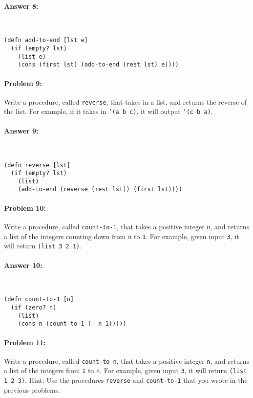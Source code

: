 \documentclass[12pt, letterpaper]{article}
\begin{document}
\paragraph{Answer 8:}~\begin{lstlisting}
(defn add-to-end [lst e]
  (if (empty? lst)
    (list e)
    (cons (first lst) (add-to-end (rest lst) e))))
\end{lstlisting}

\hrulefill
\paragraph{Problem 9:}
  Write a procedure, called \texttt{reverse}, that takes in a list, and returns
  the reverse of the list. For example, if it takes in \texttt{'(a b c)}, it
  will output \texttt{'(c b a)}.

\paragraph{Answer 9:}~\begin{lstlisting}
(defn reverse [lst]
  (if (empty? lst)
    (list)
    (add-to-end (reverse (rest lst)) (first lst))))
\end{lstlisting}

\hrulefill
\paragraph{Problem 10:}
  Write a procedure, called \texttt{count-to-1}, that takes a positive
  integer \texttt{n}, and returns a list of the integers counting down
  from \texttt{n} to \texttt{1}. For example, given input \texttt{3},
  it will return \texttt{(list 3 2 1)}.

\paragraph{Answer 10:}~\begin{lstlisting}
(defn count-to-1 [n]
  (if (zero? n)
    (list)
    (cons n (count-to-1 (- n 1)))))
\end{lstlisting}

\hrulefill
\paragraph{Problem 11:}
  Write a procedure, called \texttt{count-to-n}, that takes a positive
  integer \texttt{n}, and returns a list of the integers from
  \texttt{1} to \texttt{n}. For example, given input \texttt{3}, it
  will return \texttt{(list 1 2 3)}. Hint: Use the procedures
  \texttt{reverse} and \texttt{count-to-1} that you wrote in the
  previous problems.
\end{document}
